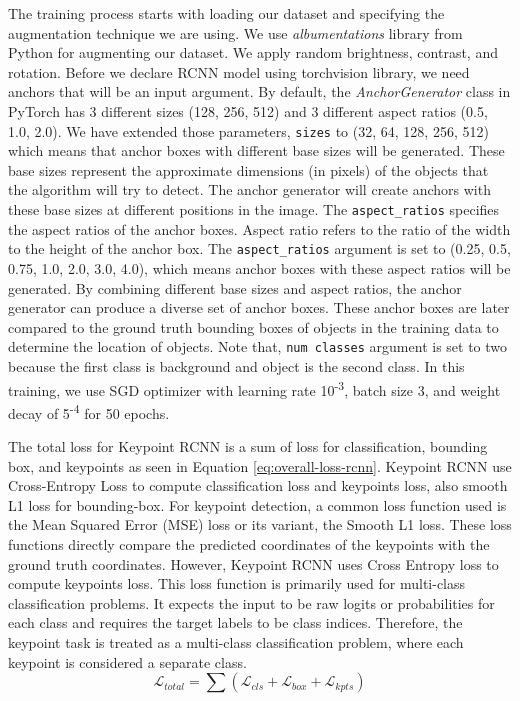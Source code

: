 The training process starts with loading our dataset and specifying the augmentation technique we are using. We use \emph{albumentations} library from Python for augmenting our dataset.
We apply random brightness, contrast, and rotation.
Before we declare RCNN model using torchvision library, we need anchors that will be an input argument. 
By default, the \emph{AnchorGenerator} class in PyTorch has 3 different sizes (128, 256, 512) and 3 different aspect ratios (0.5, 1.0, 2.0).
We have extended those parameters, \verb|sizes| to (32, 64, 128, 256, 512) which means that anchor boxes with different base sizes will be generated. These base sizes represent the approximate dimensions (in pixels) of the objects that the algorithm will try to detect.
The anchor generator will create anchors with these base sizes at different positions in the image.
The \verb|aspect_ratios| specifies the aspect ratios of the anchor boxes. Aspect ratio refers to the ratio of the width to the height of the anchor box.
The \verb|aspect_ratios| argument is set to (0.25, 0.5, 0.75, 1.0, 2.0, 3.0, 4.0), which means anchor boxes with these aspect ratios will be generated. By combining different base sizes and aspect ratios, the anchor generator can produce a diverse set of anchor boxes.
These anchor boxes are later compared to the ground truth bounding boxes of objects in the training data to determine the location of objects.
Note that, \verb|num classes| argument is set to two because the first class is background and object is the second class.
In this training, we use SGD optimizer with learning rate 10\textsuperscript{-3}, batch size 3, and weight decay of 5\textsuperscript{-4} for 50 epochs.

The total loss for Keypoint RCNN is a sum of loss for classification, bounding box, and keypoints as seen in Equation \ref{eq:overall-loss-rcnn}.
Keypoint RCNN use Cross-Entropy Loss to compute classification loss and keypoints loss, also smooth L1 loss for bounding-box. 
For keypoint detection, a common loss function used is the Mean Squared Error (MSE) loss or its variant, the Smooth L1 loss. These loss functions directly compare the predicted coordinates of the keypoints with the ground truth coordinates.
However, Keypoint RCNN uses Cross Entropy loss to compute keypoints loss. This loss function is primarily used for multi-class classification problems. It expects the input to be raw logits or probabilities for each class and requires the target labels to be class indices. Therefore, the keypoint task is treated as a multi-class classification problem, where each keypoint is considered a separate class.
\begin{equation}
  \label{eq:overall-loss-rcnn}
  \mathcal{L}_{total} = \sum (\mathcal{L}_{cls} + \mathcal{L}_{box} + \mathcal{L}_{kpts})
\end{equation}

